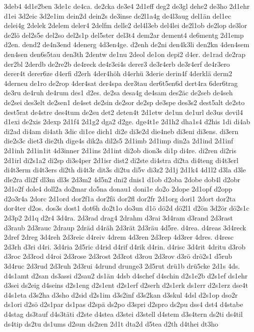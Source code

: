 {3deb4
4d1e2ben
3de1c
de4ca.
de2cka
de3e4
2d1eff
deg2
de3gl
dehe2
de3ho
2d1ehr
d1ei
3d2eic
3d2e1im
dein2d
dein2s
de3inse
de2l1a4g
de4l3aug
del1än
del1ec
delei4g
2delek
2delem
deler4
2delfm
delle2
del4l3eb
del4lei
de2l1ob
de2lop
de3lor
de2lö
del2s5e
del2so
del2s1p
del5ster
del3t4
dem2ar
dement4
de6mentg
2d1emp
d2en.
dend2
de4n3end
4denerg
4d3en4ge.
d2enh
de2ni
den4k3li
den2kn
4den4sem
den4sen
den6s5tau
den3th
2dentw
de1nu
2deol
de1on
depi2
d4er.
de1rad
de2rap
der2bl
2derdb
de2re2b
de4reck
de4r3ei4s
derer3
de3r4erb
de3r4erf
de4r3ero
derer4t
derer6ze
d4erfi
d2erh
4der4höh
d4erhü
3derie
derin4f
4derklä
derm2
4derneu
de1ro
de2rop
4der4sat
der4spa
der3tau
der6t5en6d
dert4ra
6der6trag
de3ru
de4ruh
de4rum
des1
d2es.
de2sa
desa4g
de4sam
des2äc
de2seb
de4seh
de2sei
des3elt
de2sen1
de4set
de2sin
de2sor
de2sp
de3spe
des3s2
dest5alt
de2sto
dest5rat
de4stre
des4tum
de2su
det2
deten4t
2d1etw
de1un
de1url
de3us
devil4
d1exi
de2xis
2dexp
2d1f4
2d1g2
dga2
d2ge.
dge4t1e
2d1h2
dha1s4
d2his
1di
di4ab
di2ad
di4am
di4ath
3dic
di1ce
dich1
di2e
di3e2d
die4neb
di3eni
di3ens.
di3ern
die2s3c
diet3
die2th
dige4s
dik2a
dil2s5
2d1imb
2d1imp
din2a
2d1ind
2d1inf
2d1inh
2d1in1it
4d3inner
2d1ins
2d1int
di2ob
dion3s
di1p
di4re.
di2ren
di2ris
2d1irl
di2s1a2
di2sp
di3s4per
2d1isr
dist2
di2ste
di4stra
di2ta
di4teng
di4t3erl
di4t3erm
di4t3ers
di2th
di4t3r
dit3s
di2tu
di5v
di3z2
2d1j
2d1k4
4d1l2
d3la
d3le
dle2ra
dli2f
dl3m
dl3s
2d3m2
4d5n2
dni2
dnis1
d1ob
d2oba
2dobe
dob4l
d2obr
2d1o2f
dole4
doll2a
do2mar
do5na
donau1
doni1e
do2o
2dope
2d1opf
d2opp
d2o3r4a
2dorc
2d1ord
dor2f1a
dor2fä
dor2fl
dor2fr
2d1org
dori1
2dort
dor2ta
dor4ter
d2os.
dos3s
dost1
dot6h
do2t1o
do3un
d1ö
dö2d
dö2l1
d2ön
3d2ör
dö2s1c
2d3p2
2d1q
d2r4
3d4ra.
2d3rad
drag4
2drahm
d3rai
3d4ram
d3rand
2d3rast
d3raub
2d3rauc
2draup
2dräd
d4räh
2d3rät
2d3räu
4d5re.
d4rea.
d4reas
3d4reck
2dref
2dreg
3d4reh
2d3reic
d4reiv
4drem
4d3ren
2d3rep
4d3rer
4dres.
d4resc
2d3rh
d3ri
d4ri.
3d4ria
2d5ric
d4rid
d4rif
d4rik
d4rin.
d4risc
3d4rit
4dritu
d3rob
d3roc
2d3rod
d4roi
2d3rose
2d3rost
2d3rot
d3rou
2d3rov
d3rö
drö2s1
d5rub
3d4ruc
2d3rud
2d3ruh
2d3rui
4drund
drunge3
2d5rut
drü1b
drü5cke
2d1s
4ds.
d4s1amt
d2san
ds3assi
d2sau2
ds1än
4dsb
d4schef
d4schin
d2s1e2b
d2s1ef
ds1ehr
d3sei
ds2eig
d4seins
d2s1eng
d2s1ent
d2s1erf
d2serh
d2s1erk
ds1err
d2s1erz
dse4t
d4s1eta
d3s2ha
d3sho
d2sid
d2s1im
d3s2inf
d3s2kan
d3skul
4dsl
d2s1op
dso2r
ds1ori
d2sö
d2s1par
ds1pas
d2spä
ds2po
d3spri
d2spro
ds2pu
dss4
dst4
d4stabe
d4stag
ds3tauf
d4s3täti
d2ste
d4stea
d3stei
d3stell
d4stem
d3s4tern
ds2ti
ds4til
ds4tip
ds2tu
ds1ums
d2sun
ds2zen
2d1t
dta2d
d5tea
d2th
d4thei
dt3ho
}
